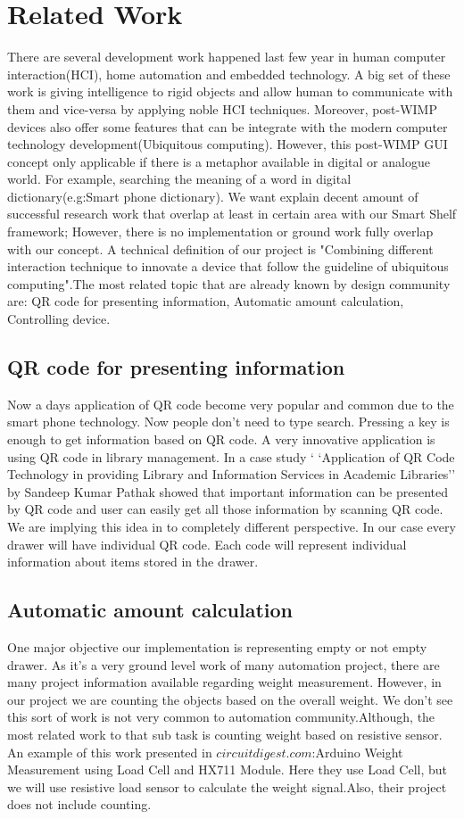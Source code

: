 \documentclass{sigchi}
\begin{document}
\section{Related Work}

There are several development work happened last few year in human computer interaction(HCI), home automation and embedded technology. A big set of these work is giving intelligence to rigid objects and allow human to communicate with them and vice-versa by applying noble HCI techniques. Moreover, post-WIMP devices also offer some features that can be integrate with the modern computer technology development(Ubiquitous computing). However, this post-WIMP GUI concept only applicable if there is a metaphor available in digital or analogue world. For example, searching the meaning of a word in digital dictionary(e.g:Smart phone dictionary). We want explain decent amount of successful research work that overlap at least in certain area with our Smart Shelf framework; However, there is no implementation or ground work fully overlap with our concept. A technical definition of our project is "Combining different interaction technique to innovate a device that follow the guideline of ubiquitous computing".The most related topic that are already known by design community are: QR code for presenting information, Automatic amount calculation, Controlling device.    
\subsection{QR code for presenting information}
Now a days application of QR code become very popular and common due to the smart phone technology. Now people don't need to type search. Pressing a key is enough to get information based on QR code. A very innovative application is using QR code in library management. In a case study ` `Application of QR Code Technology in providing Library and Information Services in Academic Libraries'' by  Sandeep
Kumar Pathak showed that important information can be presented by QR code and user can easily get all those information by scanning QR code. 
We are implying this idea in to completely different perspective. In our case every drawer will have individual QR code. Each code will represent individual information about items stored in the drawer. 
\subsection{Automatic amount calculation}
One major objective our implementation is representing empty or not empty drawer. As it's a very ground level work of many automation project, there are many project information available regarding weight measurement. However, in our project we are counting the objects based on the overall weight. We don't see this sort of work is not very common to automation community.Although, the most related work to that sub task is counting weight based on resistive sensor. An example of this work presented in $circuitdigest.com$:Arduino Weight Measurement using Load Cell and HX711 Module. Here they use Load Cell, but we will use resistive load sensor to calculate the weight signal.Also, their project does not include counting.
\end{document}
